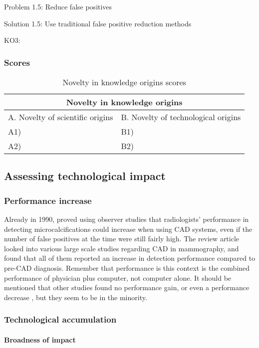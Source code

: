 Problem 1.5: Reduce false positives

Solution 1.5: Use traditional false positive reduction methods

KO3: 

\subsubsection{Scores}
\begin{table}[h]
\centering
\begin{tabular}{l l}
\hline
\multicolumn{2}{|c|}{Novelty in knowledge origins} \\
\hline
A. Novelty of scientific origins & B. Novelty of technological origins\\
A1) & B1)\\ 
A2) & B2)\\ 
\hline
\end{tabular}
\caption{Novelty in knowledge origins scores}
\label{tbl:origscores5}
\end{table}

\subsection{Assessing technological impact}
\subsubsection{Performance increase}
Already in 1990, \cite{cadsynergy} proved using observer studies that
radiologists' performance in detecting microcalcifications could increase when
using CAD systems, even if the number of false positives at the time were still
fairly high. The review article \cite{cadhistory} looked into various large
scale studies regarding CAD in mammography, and found that all of them reported
an increase in detection performance compared to pre-CAD diagnosis. Remember
that performance is this context is the combined performance of physician plus
computer, not computer alone. It should be mentioned that other studies found no
performance gain, or even a performance decrease \cite{mammocadbad}, but they
seem to be in the minority.

\subsubsection{Technological accumulation}
\paragraph{Broadness of impact}

